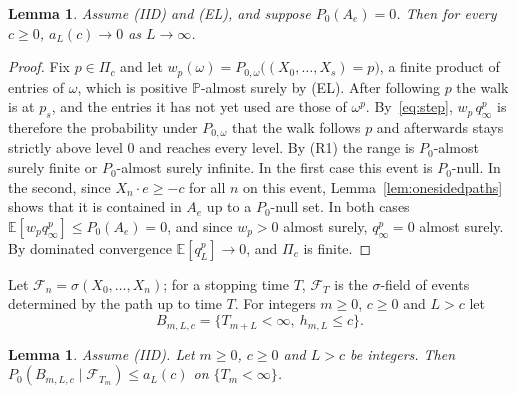 \documentclass[11pt]{amsart}
\newtheorem{lemma}[theorem]{Lemma}
\theoremstyle{remark}
\newcommand{\E}{\mathbb{E}}
\newcommand{\Prob}{\mathbb{P}}
\begin{document}
\begin{lemma}\label{lem:prefix}
Assume (IID) and (EL), and suppose $P_0(A_e)=0$. Then for every $c\ge0$, $a_L(c)\to0$ as $L\to\infty$.
\end{lemma}

\begin{proof}
Fix $p\in\Pi_c$ and let $w_p(\omega)=P_{0,\omega}\bigl((X_0,\dots,X_s)=p\bigr)$, a finite product of entries of
$\omega$, which is positive $\Prob$-almost surely by (EL). After following $p$ the walk is at $p_s$, and the entries it has
not yet used are those of $\omega^p$. By~\eqref{eq:step}, $w_p\,q_\infty^p$ is therefore the probability under
$P_{0,\omega}$ that the walk follows $p$ and afterwards stays strictly above level $0$ and reaches every level. By (R1) the range is $P_0$-almost surely finite or
$P_0$-almost surely infinite. In the first case this event is $P_0$-null. In the second, since $X_n\cdot e\ge-c$ for all $n$ on this event, Lemma~\ref{lem:onesidedpaths} shows
that it is contained in $A_e$ up to a $P_0$-null set. In both cases $\E[w_pq_\infty^p]\le P_0(A_e)=0$, and since
$w_p>0$ almost surely, $q_\infty^p=0$ almost surely. By dominated convergence $\E[q_L^p]\to0$, and $\Pi_c$ is finite.
\end{proof}

Let $\mathcal F_n=\sigma(X_0,\dots,X_n)$; for a stopping time $T$, $\mathcal F_T$ is the $\sigma$-field of events
determined by the path up to time $T$. For integers $m\ge0$, $c\ge0$ and $L>c$ let
\[
B_{m,L,c}=\{T_{m+L}<\infty,\ h_{m,L}\le c\}.
\]

\begin{lemma}\label{lem:fresh}
Assume (IID). Let $m\ge0$, $c\ge0$ and $L>c$ be integers. Then $P_0(B_{m,L,c}\mid\mathcal F_{T_m})\le a_L(c)$ on $\{T_m<\infty\}$.
\end{lemma}
\end{document}
